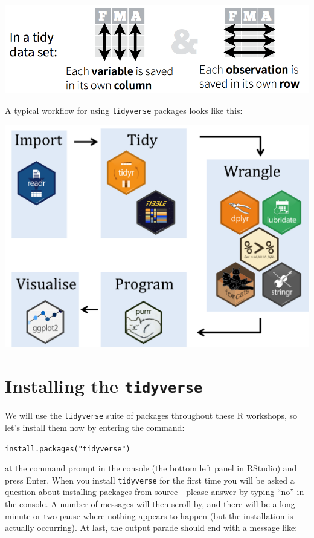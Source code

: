 \documentclass[]{book}
\begin{document}
\includegraphics{R/Rintro/images/tidy_data.png}

A typical workflow for using \texttt{tidyverse} packages looks like this:

\includegraphics{R/Rintro/images/tidy_workflow.png}

\hypertarget{installing-the-tidyverse}{%
\section{\texorpdfstring{Installing the \texttt{tidyverse}}{Installing the tidyverse}}\label{installing-the-tidyverse}}

We will use the \texttt{tidyverse} suite of packages throughout these R workshops,
so let's install them now by entering the command:

\texttt{install.packages("tidyverse")}

at the command prompt in the console (the bottom left panel in RStudio) and press Enter.
When you install \texttt{tidyverse} for the first time you will be asked a question
about installing packages from source - please answer by typing ``no'' in the console.
A number of messages will then scroll by, and there will be a long minute or two
pause where nothing appears to happen (but the installation is actually occurring).
At last, the output parade should end with a message like:
\end{document}
